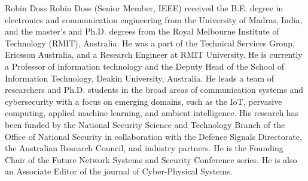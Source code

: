 \documentclass[journal]{IEEEtran}
\begin{document}

\begin{IEEEbiography}{Robin Doss}
Robin Doss (Senior Member, IEEE) received the B.E. degree in electronics and communication engineering from the University of Madras, India, and the master’s and Ph.D. degrees from the Royal Melbourne Institute of Technology (RMIT), Australia. He was a part of the Technical Services Group, Ericsson Australia, and a Research Engineer at RMIT University. He is currently a Professor of information technology and the Deputy Head of the School of Information Technology, Deakin University, Australia. He leads a team of researchers and Ph.D. students in the broad areas of communication systems and cybersecurity with a focus on emerging domains, such as the IoT, pervasive computing, applied machine learning, and ambient intelligence. His research has been funded by the National Security Science and Technology Branch of the Office of National Security in collaboration with the Defence Signals Directorate, the Australian Research Council, and industry partners. He is the Founding Chair of the Future Network Systems and Security Conference series. He is also an Associate Editor of the journal of Cyber-Physical Systems.
\end{IEEEbiography}





\end{document}
